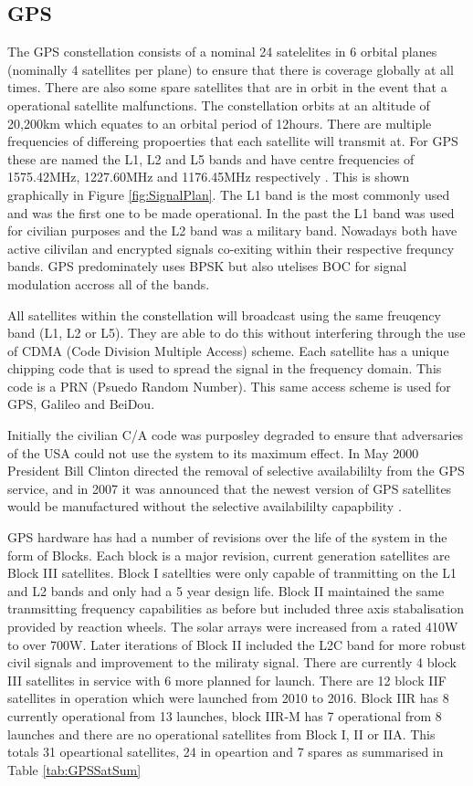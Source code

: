 \subsection{GPS} \label{subsec:GNSS_GPSIntro}
The GPS constellation consists of a nominal 24 satelelites in 6 orbital planes (nominally 4 satellites per plane) to ensure that there is coverage globally at all times.
There are also some spare satellites that are in orbit in the event that a operational satellite malfunctions. The constellation orbits at an altitude of 20,200km which
equates to an orbital period of 12hours. There are multiple frequencies of differeing propoerties that each satellite will transmit at. For GPS these are named the L1, L2
and L5 bands and have centre frequencies of 1575.42MHz, 1227.60MHz and 1176.45MHz respectively \cite{RN49}. This is shown graphically in Figure \ref{fig:SignalPlan}. The
L1 band is the most commonly used and was the first one to be made operational. In the past the L1 band was used for civilian purposes and the L2 band was a military
band. Nowadays both have active cilivilan and encrypted signals co-exiting within their respective frequncy bands. GPS predominately uses BPSK but also utelises BOC for
signal modulation accross all of the bands. 

All satellites within the constellation will broadcast using the same freuqency band (L1, L2 or L5). They are able to do this without interfering through the use of CDMA
(Code Division Multiple Access) scheme. Each satellite has a unique chipping code that is used to spread the signal in the frequency domain. This code is a PRN (Psuedo
Random Number). This same access scheme is used for GPS, Galileo and BeiDou.

Initially the civilian C/A code was purposley degraded to ensure that adversaries of the USA could not use the system to its maximum effect. In May 2000 President Bill
Clinton directed the removal of selective availabililty from the GPS service, and in 2007 it was announced that the newest version of GPS satellites would be manufactured
without the selective availabililty capapbility \cite{RN62} \cite{RN64}.

GPS hardware has had a number of revisions over the life of the system in the form of Blocks. Each block is a major revision, current generation satellites are Block III
satellites. Block I satellties were only capable of tranmitting on the L1 and L2 bands and only had a 5 year design life. Block II maintained the same tranmsitting
frequency capabilities as before but included three axis stabalisation provided by reaction wheels. The solar arrays were increased from a rated 410W to over 700W. Later
iterations of Block II included the L2C band for more robust civil signals and improvement to the miliraty signal.
There are currently 4 block III satellites in service with 6 more planned for launch. There are 12 block IIF satellites in operation which were launched from
2010 to 2016. Block IIR has 8 currently operational from 13 launches, block IIR-M has 7 operational from 8 launches and there are no operational satellites from Block I,
II or IIA. This totals 31 opeartional satellites, 24 in opeartion and 7 spares as summarised in Table \ref{tab:GPSSatSum}


